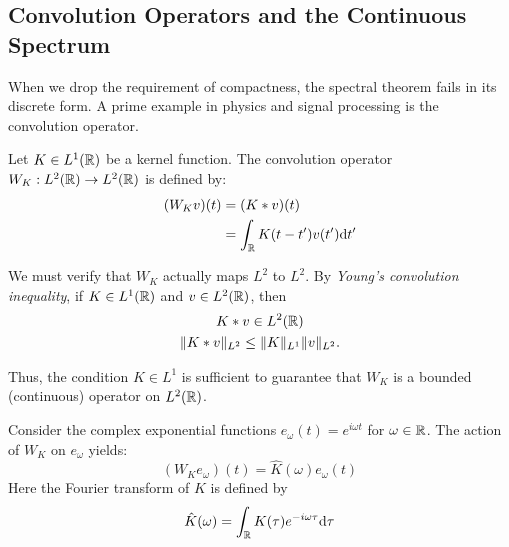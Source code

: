 \subsection{Convolution Operators and the Continuous Spectrum}

When we drop the requirement of compactness, the spectral theorem fails in its discrete form. A prime example in physics and signal processing is the convolution operator.

\begin{definition}
Let $K \in L^1(\mathbb{R})$ be a kernel function. The convolution operator $W_K: L^2(\mathbb{R}) \to L^2(\mathbb{R})$ is defined by:
\begin{equation}
\begin{aligned}
(W_K v)(t) &= (K * v)(t) \\
&= \int_{\mathbb{R}} K(t-t') v(t') \mathrm{d} t'
\end{aligned}
\end{equation}

\end{definition}

\begin{remark}
We must verify that $W_K$ actually maps $L^2$ to $L^2$. By \textit{Young's convolution inequality}, if $K \in L^1(\mathbb{R})$ and $v \in L^2(\mathbb{R})$, then
\[
\begin{gathered}
K * v \in L^2(\mathbb{R}) \\
\|K * v\|_{L^2} \leq \|K\|_{L^1} \|v\|_{L^2}.
\end{gathered}
\]

Thus, the condition $K \in L^1$ is sufficient to guarantee that $W_K$ is a bounded (continuous) operator on $L^2(\mathbb{R})$.
\end{remark}

\begin{proposition}
Consider the complex exponential functions $e_\omega(t) = e^{i\omega t}$ for $\omega \in \mathbb{R}$. The action of $W_K$ on $e_\omega$ yields:
\begin{equation}
(W_K e_\omega)(t) = \hat{K}(\omega) e_\omega(t)
\end{equation}
Here the Fourier transform of $K$ is defined by
\[
\hat{K}(\omega) = \int_{\mathbb{R}} K(\tau) e^{-i\omega \tau} \mathrm{d} \tau
\]

\end{proposition}

